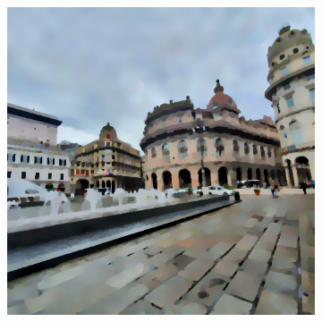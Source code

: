 \begin{figure}
\begin{minipage}{\textwidth}
\begin{subfigure}{.3\textwidth}
		\end{subfigure}\hfill%
		\begin{subfigure}{.3\textwidth}%
			\includegraphics[width=\textwidth]{atelier/breg_cat/cat-20.png}
		\end{subfigure}
	\end{minipage}\\%
	

\end{figure}
